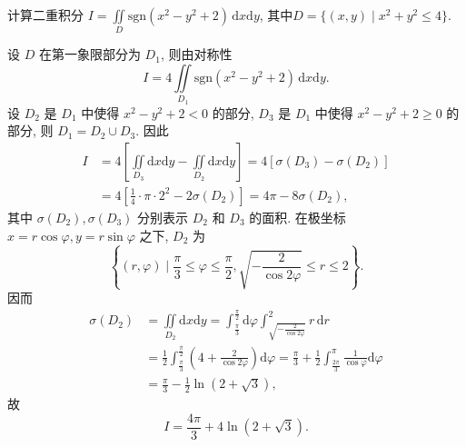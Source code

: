 \documentclass[../../main.tex]{subfiles}
\begin{document}
\begin{example}
计算二重积分 \( I = \iint\limits_D \text{sgn}(x^2 - y^2 + 2) \, \mathrm{d}x\mathrm{d}y \), 其中$D = \{ (x,y) \mid x^2 + y^2 \leqslant 4 \}.$
\end{example}
\begin{solution}
设 \( D \) 在第一象限部分为 \( D_1 \), 则由对称性
\[
I = 4 \iint\limits_{D_1} \text{sgn}(x^2 - y^2 + 2) \, \mathrm{d}x\mathrm{d}y.
\]
设 \( D_2 \) 是 \( D_1 \) 中使得 \( x^2 - y^2 + 2 < 0 \) 的部分, \( D_3 \) 是 \( D_1 \) 中使得 \( x^2 - y^2 + 2 \geqslant 0 \) 的部分, 则 \( D_1 = D_2 \cup D_3 \). 因此
\begin{align*}
I &= 4 \left[ \iint\limits_{D_3} \mathrm{d}x\mathrm{d}y - \iint\limits_{D_2} \mathrm{d}x\mathrm{d}y \right] = 4 [\sigma(D_3) - \sigma(D_2)]
\\
&= 4 \left[ \frac{1}{4} \cdot \pi \cdot 2^2 - 2\sigma(D_2) \right] = 4\pi - 8\sigma(D_2),
\end{align*}
其中 \( \sigma(D_2), \sigma(D_3) \) 分别表示 \( D_2 \) 和 \( D_3 \) 的面积. 在极坐标 \( x = r\cos\varphi, y = r\sin\varphi \) 之下, \( D_2 \) 为
\[
\left\{ (r,\varphi) \mid \frac{\pi}{3} \leqslant \varphi \leqslant \frac{\pi}{2}, \sqrt{-\frac{2}{\cos 2\varphi}} \leqslant r \leqslant 2 \right\}.
\]
因而
\begin{align*}
\sigma(D_2) &= \iint\limits_{D_2} \mathrm{d}x\mathrm{d}y = \int_{\frac{\pi}{3}}^{\frac{\pi}{2}} \mathrm{d}\varphi \int_{\sqrt{-\frac{2}{\cos 2\varphi}}}^2 r \, \mathrm{d}r
\\
&= \frac{1}{2} \int_{\frac{\pi}{3}}^{\frac{\pi}{2}} \left( 4 + \frac{2}{\cos 2\varphi} \right) \mathrm{d}\varphi = \frac{\pi}{3} + \frac{1}{2} \int_{\frac{2\pi}{3}}^{\pi} \frac{1}{\cos\varphi} \mathrm{d}\varphi
\\
&= \frac{\pi}{3} - \frac{1}{2} \ln(2 + \sqrt{3}),
\end{align*}
故
\[
I = \frac{4\pi}{3} + 4\ln(2 + \sqrt{3}).
\]
\end{solution}
\end{document}
